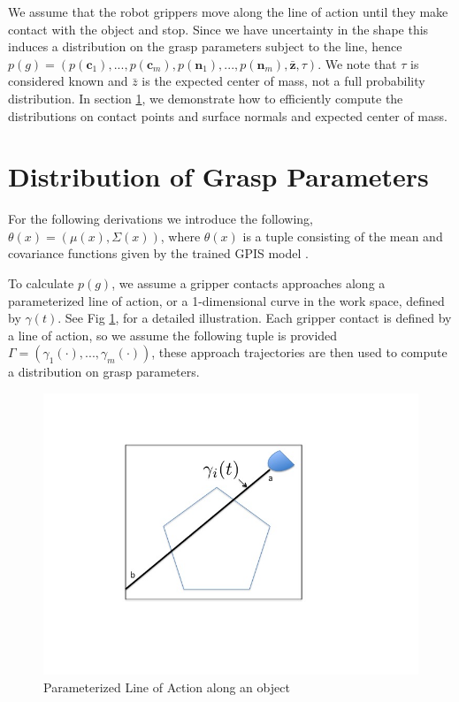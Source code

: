 \documentclass[letterpaper, 10 pt, conference]{ieeeconf}  %
\begin{document}
We assume that the robot grippers move along the line of action until they make contact with the object and stop.
Since we have uncertainty in the shape this induces a distribution on the grasp parameters subject to the line, hence $p(g) = ( p(\textbf{c}_1),...,p(\textbf{c}_m),p(\textbf{n}_1),...,p(\textbf{n}_m),\bar{\textbf{z}},\tau )$.
We note that $\tau$ is considered known and $\bar{z}$ is the expected center of mass, not a full probability distribution. In section \ref{sec:distgrasp}, we demonstrate how to efficiently compute the distributions on contact points and surface normals and expected center of mass. 




\section{Distribution of Grasp Parameters}
\label{sec:distgrasp}

 For the following derivations we introduce the following,
 $\theta(x) = ( \mu(x),\Sigma(x) )$, where $\theta(x)$ is a tuple consisting of the mean and covariance functions given by the trained GPIS model \cite{rasmussen2006} . 
 
 To calculate $p(g)$, we assume a gripper contacts approaches along a parameterized line of action, or a 1-dimensional curve in the work space, defined by $\gamma(t)$. See Fig \ref{fig:line_of_action}, for a detailed illustration. Each gripper contact is defined by a line of action, so we assume the following tuple is provided $\Gamma = ( \gamma_1(\cdot),...,\gamma_m(\cdot) )$, these approach trajectories are then used to compute a distribution on grasp parameters. 
 






\begin{figure}[ht!]
\centering
\includegraphics[scale = 0.3]{figures/Slide01.jpg}
\caption{Parameterized Line of Action along an object}
\vspace*{-10pt}
\label{fig:line_of_action}
\end{figure}
\end{document}
